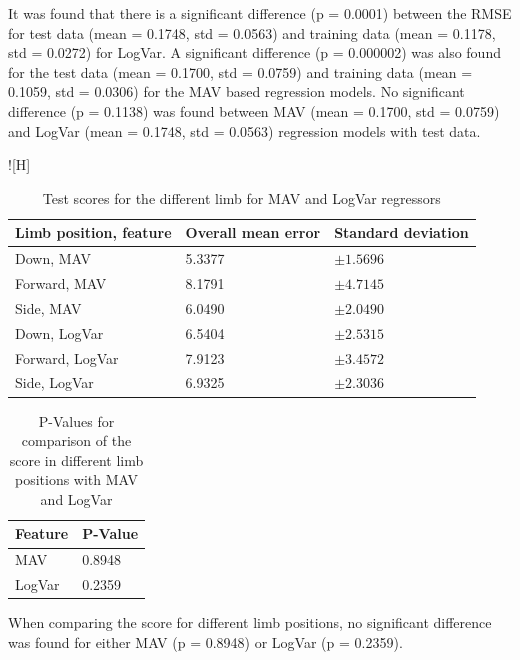 \documentclass[a4paper, 10pt, conference]{ieeeconf}      %
\begin{document}
\begin{multicol}{2}
	It was found that there is a significant difference (p = 0.0001) between the RMSE for test data (mean = 0.1748, std = 0.0563) and training data (mean = 0.1178, std = 0.0272) for LogVar. A significant difference (p = 0.000002) was also found for the test data (mean = 0.1700, std = 0.0759) and training data (mean = 0.1059, std = 0.0306) for the MAV based regression models. No significant difference (p = 0.1138) was found between MAV (mean = 0.1700, std = 0.0759) and LogVar (mean = 0.1748, std = 0.0563) regression models with test data.
	
	\begin{table}![H]
		\begin{center}
			\begin{tabular}{l l l}
				\hline
				\textbf{Limb position, feature} & \textbf{Overall mean error} & \textbf{Standard deviation}\\
				\hline
				Down, MAV & 5.3377 & $\pm 1.5696$ \\
				Forward, MAV & 8.1791 & $\pm 4.7145$ \\
				Side, MAV & 6.0490 & $\pm 2.0490$ \\
				Down, LogVar & 6.5404 & $\pm 2.5315$ \\
				Forward, LogVar & 7.9123 & $\pm 3.4572$ \\
				Side, LogVar & 6.9325 & $\pm 2.3036$ \\
				\hline
			\end{tabular}
			\caption{Test scores for the different limb for MAV and LogVar regressors}
		\end{center}
	\end{table}
	\begin{table}[H]
		\begin{center}
			\begin{tabular}{l l}
				\hline
				\textbf{Feature} & \textbf{P-Value}\\
				\hline
				MAV & 0.8948 \\
				LogVar & 0.2359 \\
				\hline
			\end{tabular}
			\caption{P-Values for comparison of the score in different limb positions with MAV and LogVar}
		\end{center}
	\end{table}
	
	When comparing the score for different limb positions, no significant difference was found for either MAV (p = 0.8948) or LogVar (p = 0.2359).
	

\end{multicol}
\end{document}
